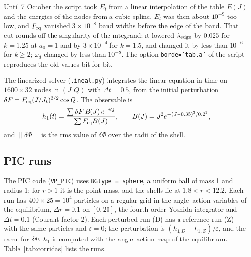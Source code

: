 \documentclass[11pt,a4paper]{article}
\begin{document}
Until 7 October the script took $E_t$ from a linear interpolation of the table $E(J)$ and the
energies of the nodes from a cubic spline. $E_t$ was then about $10^{-9}$ too low, and
$F_{\rm eq}$ vanished $3\times10^{-8}$ band widths before the edge of the band. That cut rounds
off the singularity of the integrand: it lowered $\lambda_{\rm edge}$ by $0.025$ for $k=1.25$ at
$a_0=1$ and by $3\times10^{-4}$ for $k=1.5$, and changed it by less than $10^{-6}$ for $k\ge2$;
$\omega_d$ changed by less than $10^{-8}$. The option \texttt{borde='tabla'} of the script
reproduces the old values bit for bit.

The linearized solver (\texttt{lineal.py}) integrates the linear equation in time on
$1600\times32$ nodes in $(J,Q)$ with $\Delta t=0.5$, from the initial perturbation
$\delta F=F_{\rm eq}(J/J_t)^{3/2}\cos Q$. The observable is
\[
  h_1(t)=\frac{\sum\delta F\,B(J)\,e^{-iQ}}{\sum F_{\rm eq}B(J)},\qquad
  B(J)=J^2e^{-(J-0.35)^2/0.2^2},
\]
and $\|\delta\Phi\|$ is the rms value of $\delta\Phi$ over the radii of the shell.

\subsection{PIC runs}

The PIC code (\texttt{VP\_PIC}) uses \texttt{BGtype = sphere}, a uniform ball of mass 1 and
radius 1: for $r>1$ it is the point mass, and the shells lie at $1.8<r<12.2$. Each run has
$400\times25=10^4$ particles on a regular grid in the angle--action variables of the
equilibrium, $\Delta r=0.1$ on $[0,20]$, the fourth-order Yoshida integrator and
$\Delta t=0.1$ (Courant factor 2). Each perturbed run (D) has a reference run (Z) with the
same particles and $\varepsilon=0$; the perturbation is $(h_{1,D}-h_{1,Z})/\varepsilon$, and
the same for $\delta\Phi$. $h_1$ is computed with the angle--action map of the equilibrium.
Table~\ref{tab:corridas} lists the runs.
\end{document}
